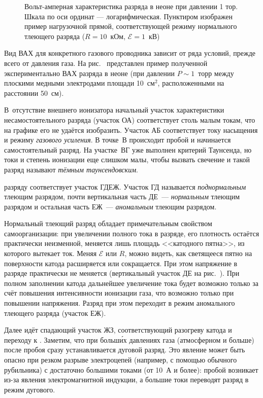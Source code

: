 \begin{figure}[h!]
    \centering
    \caption{Вольт-амперная характеристика разряда в неоне при давлении 1 тор. 
        Шкала по оси ординат --- логарифмическая.
        Пунктиром изображен пример нагрузочной прямой,
        соответствующей режиму нормального тлеющего разряда
        ($R=10$~кОм, $\mathcal{E}=1$~кВ)}
\end{figure}

Вид ВАХ для конкретного газового проводника зависит от ряда условий, прежде
всего от давления газа. На рис.~ представлен пример
полученной экспериментально ВАХ разряда в неоне (при давлении $P\sim 1$~торр
между плоскими медными электродами площади 10~см$^2$, расположенными на
расстоянии 50~см).

В~отсутствие внешнего ионизатора начальный участок
характеристики несамостоятельного разряда (участок ОА) соответствует столь
малым токам, что на графике его не удаётся изобразить. Участок 
АБ соответствует току насыщения и режиму \emph{газового усиления}. 
В точке~В происходит пробой и начинается самостоятельный
разряд. На участке~ВГ уже выполнен критерий Таунсенда, но 
токи и степень ионизации еще слишком малы, чтобы вызвать свечение 
и такой разряд называют \emph{тёмным таунсендовским}.

 разряду соответствует участок ГДЕЖ.
Участок ГД называется \emph{поднормальным} тлеющим разрядом,
почти вертикальная часть ДЕ~--- \emph{нормальным} тлеющим разрядом и
остальная часть ЕЖ~--- \emph{аномальным} тлеющим разрядом.

Нормальный тлеющий разряд обладает примечательным свойством самоорганизации:
при увеличении полного тока в разряде, его плотность остаётся практически
неизменной, меняется лишь площадь <<катодного пятна>>, из которого вытекает ток.
Меняя $\mathcal{E}$ или $R$, можно видеть, как светящееся пятно
на поверхности катода расширяется или сокращается.
При этом напряжение в разряде практически не меняется
(вертикальный участок ДЕ на рис.~).
При полном заполнении катода дальнейшее увеличение тока будет возможно только за
счёт повышения интенсивности ионизации газа, что возможно только при повышении
напряжения. Разряд при этом переходит в режим аномального тлеющего разряда
(участок ЕЖ).

Далее идёт спадающий участок ЖЗ, соответствующий разогреву катода и 
переходу к . Заметим, что при больш\'{и}х давлениях газа
(атмосферном и больше) после пробоя сразу устанавливается дуговой разряд.
Это явление может быть опасно при резком разрыве электроцепей (например, с помощью
обычного рубильника) с достаточно большими токами (от 10~А и более): пробой
возникает из-за явления электромагнитной индукции, а большие токи 
переводят разряд в режим дугового.

